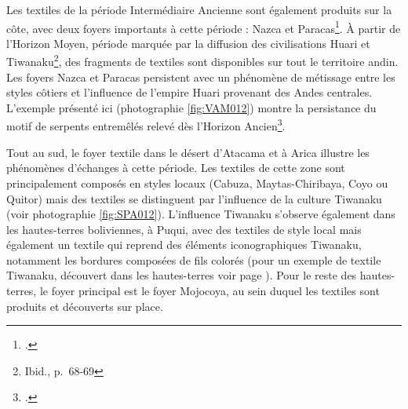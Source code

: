 \noindent Les textiles de la période Intermédiaire Ancienne sont également produits sur la côte, avec deux foyers importants à cette période : Nazca et Paracas\footcite[p.~58-59]{boissiereAtlasAmeriquePrecolombienne2022}.
À partir de l'Horizon Moyen, période marquée par la diffusion des civilisations Huari et Tiwanaku\footnote{Ibid., p.~68-69}, des fragments de textiles sont disponibles sur tout le territoire andin. Les foyers Nazca et Paracas persistent avec un phénomène de métissage entre les styles côtiers et l'influence de l'empire Huari provenant des Andes centrales. L'exemple présenté ici (photographie \ref{fig:VAM012}) montre la persistance du motif de serpents entremêlés relevé dès l'Horizon Ancien\footcite[p.~1]{desrosiersRevisitingOcucajeOpened2008}.

\noindent Tout au sud, le foyer textile dans le désert d'Atacama et à Arica illustre les phénomènes d'échanges à cette période. Les textiles de cette zone sont principalement composés en styles locaux (Cabuza, Maytas-Chiribaya, Coyo ou Quitor) mais des textiles se distinguent par l'influence de la culture Tiwanaku (voir photographie \ref{fig:SPA012}). L'influence Tiwanaku s'observe également dans les hautes-terres boliviennes, à Puqui, avec des textiles de style local mais également un textile qui reprend des éléments iconographiques Tiwanaku, notamment les bordures composées de fils colorés (pour un exemple de textile Tiwanaku, découvert dans les hautes-terres voir page \pageref{fig:MNA037}). Pour le reste des hautes-terres, le foyer principal est le foyer Mojocoya, au sein duquel les textiles sont produits et découverts sur place.


